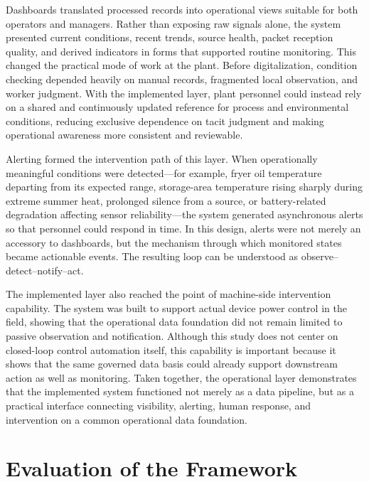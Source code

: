 \documentclass[systems,article,submit,pdftex,moreauthors]{Definitions/mdpi}
\begin{document}
Dashboards translated processed records into operational views suitable for both operators and managers. Rather than exposing raw signals alone, the system presented current conditions, recent trends, source health, packet reception quality, and derived indicators in forms that supported routine monitoring. This changed the practical mode of work at the plant. Before digitalization, condition checking depended heavily on manual records, fragmented local observation, and worker judgment. With the implemented layer, plant personnel could instead rely on a shared and continuously updated reference for process and environmental conditions, reducing exclusive dependence on tacit judgment and making operational awareness more consistent and reviewable.

Alerting formed the intervention path of this layer. When operationally meaningful conditions were detected---for example, fryer oil temperature departing from its expected range, storage-area temperature rising sharply during extreme summer heat, prolonged silence from a source, or battery-related degradation affecting sensor reliability---the system generated asynchronous alerts so that personnel could respond in time. In this design, alerts were not merely an accessory to dashboards, but the mechanism through which monitored states became actionable events. The resulting loop can be understood as observe--detect--notify--act.

The implemented layer also reached the point of machine-side intervention capability. The system was built to support actual device power control in the field, showing that the operational data foundation did not remain limited to passive observation and notification. Although this study does not center on closed-loop control automation itself, this capability is important because it shows that the same governed data basis could already support downstream action as well as monitoring. Taken together, the operational layer demonstrates that the implemented system functioned not merely as a data pipeline, but as a practical interface connecting visibility, alerting, human response, and intervention on a common operational data foundation.



\section{Evaluation of the Framework}
\label{sec:framework_evaluation}
\end{document}
